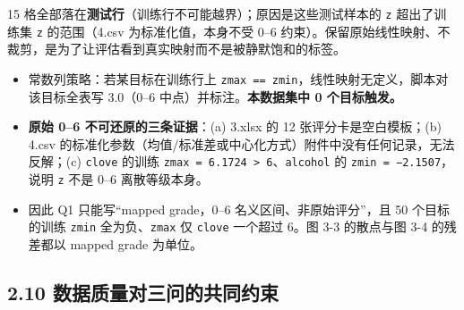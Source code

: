 \documentclass[
  11pt,
]{ctexart}
\providecommand{\tightlist}{%
  \setlength{\itemsep}{0pt}\setlength{\parskip}{0pt}}
\begin{document}
15 格全部落在\textbf{测试行}（训练行不可能越界）；原因是这些测试样本的
\texttt{z} 超出了训练集 \texttt{z} 的范围（4.csv 为标准化值，本身不受
0--6
约束）。保留原始线性映射、不裁剪，是为了让评估看到真实映射而不是被静默饱和的标签。

\begin{itemize}
\tightlist
\item
  常数列策略：若某目标在训练行上
  \texttt{zmax\ ==\ zmin}，线性映射无定义，脚本对该目标全表写 3.0（0--6
  中点）并标注。\textbf{本数据集中 0 个目标触发。}
\item
  \textbf{原始 0--6 不可还原的三条证据}：(a) 3.xlsx 的 12
  张评分卡是空白模板；(b) 4.csv
  的标准化参数（均值/标准差或中心化方式）附件中没有任何记录，无法反解；(c)
  \texttt{clove} 的训练
  \texttt{zmax\ =\ 6.1724\ \textgreater{}\ 6}、\texttt{alcohol} 的
  \texttt{zmin\ =\ −2.\allowbreak{}1507}，说明 \texttt{z} 不是 0--6 离散等级本身。
\item
  因此 Q1 只能写``mapped grade，0--6 名义区间、非原始评分''，且 50
  个目标的训练 \texttt{zmin} 全为负、\texttt{zmax} 仅 \texttt{clove}
  一个超过 6。图 3-3 的散点与图 3-4 的残差都以 mapped grade 为单位。
\end{itemize}

\subsection{2.10
数据质量对三问的共同约束}\label{ux6570ux636eux8d28ux91cfux5bf9ux4e09ux95eeux7684ux5171ux540cux7ea6ux675f}
\end{document}

